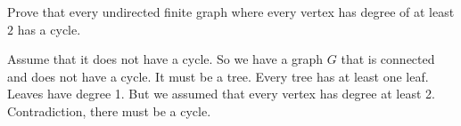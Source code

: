 \question Prove that every undirected finite graph where every vertex 
has degree of at least $2$ has a cycle.

\begin{solution}[1 in]
Assume that it does not have a cycle.
So we have a graph $G$ that is connected and does not have a cycle. 
It must be a tree.
Every tree has at least one leaf. Leaves have degree 1. But we assumed 
that every vertex has degree at least 2. Contradiction, there must be 
a cycle.
\end{solution}